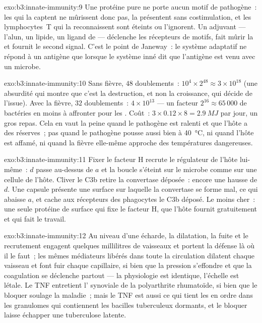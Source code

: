 \begin{solution}{exo:b3:innate-immunity:9}
Une protéine pure ne porte aucun motif de pathogène~: les  qui la captent ne mûrissent donc pas, la présentent sans
costimulation, et les lymphocytes~T qui la reconnaissent sont éteints ou
l'ignorent. Un adjuvant --- l'alun, un lipide, un ligand de  --- déclenche les récepteurs de motifs, fait mûrir la  et fournit le second signal. C'est le point de Janeway~: le
système adaptatif ne répond à un antigène que lorsque le système inné
dit que l'antigène est venu avec un microbe.
\end{solution}

\begin{solution}{exo:b3:innate-immunity:10}
Sans fièvre, $48$ doublements~: $10^{4}\times 2^{48} \approx 3\times
10^{18}$ (une absurdité qui montre que c'est la destruction, et non la
croissance, qui décide de l'issue). Avec la fièvre, $32$ doublements~:
$4\times 10^{13}$ --- un facteur $2^{16} \approx 65\,000$ de bactéries
en moins à affronter pour les . Coût~:
$3\times 0.12\times 8 = \qty{2.9}{MJ}$ par jour, un gros repas. Cela en
vaut la peine quand le pathogène est ralenti et que l'hôte a des
réserves~; pas quand le pathogène pousse aussi bien à
\qty{40}{\celsius}, ni quand l'hôte est affamé, ni quand la fièvre
elle-même approche des températures dangereuses.
\end{solution}

\begin{solution}{exo:b3:innate-immunity:11}
Fixer le facteur H recrute le régulateur de l'hôte lui-même~: $d$ passe
au-dessus de $a$ et la boucle s'éteint sur le microbe comme sur une
cellule de l'hôte. Cliver le C3b retire la convertase déposée~: encore
une hausse de $d$. Une capsule présente une surface sur laquelle la
convertase se forme mal, ce qui abaisse $a$, et cache aux récepteurs des
phagocytes le C3b déposé. Le moins cher~: une seule protéine de surface
qui fixe le facteur H, que l'hôte fournit gratuitement et qui fait le
travail.
\end{solution}

\begin{solution}{exo:b3:innate-immunity:12}
Au niveau d'une écharde, la dilatation, la fuite et le recrutement
engagent quelques millilitres de vaisseaux et portent la défense là où
il le faut~; les mêmes médiateurs libérés dans toute la circulation
dilatent chaque vaisseau et font fuir chaque capillaire, si bien que la
pression s'effondre et que la coagulation se déclenche partout --- la
physiologie est identique, l'échelle est létale. Le TNF entretient
l' synoviale de la polyarthrite rhumatoïde, si bien que le
bloquer soulage la maladie~; mais le TNF est aussi ce qui tient les
 en ordre dans les granulomes qui contiennent les bacilles
tuberculeux dormants, et le bloquer laisse échapper une tuberculose
latente.
\end{solution}

